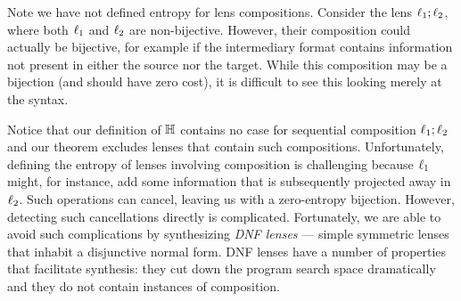 \documentclass[acmsmall,screen,anonymous]{acmart}
\begin{document}
Note we have not defined entropy for lens compositions. Consider the lens
$\mathit{\ell}_1 ; \mathit{\ell}_2$, where both $\mathit{\ell}_1$ and $\mathit{\ell}_2$ are non-bijective.
However, their composition could actually be bijective, for example if the
intermediary format contains information not present in either the source nor
the target. While this composition may be a bijection (and should have zero
cost), it is difficult to see this looking merely at the syntax.

Notice that our definition of $\mathbb{H}$ contains no case for sequential
composition $\mathit{\ell}_1 ; \mathit{\ell}_2$ and our theorem excludes lenses that contain
such compositions. Unfortunately, defining the entropy of lenses involving
composition is challenging because $\mathit{\ell}_1$ might, for instance, add some
information that is subsequently projected away in $\mathit{\ell}_2$. Such operations
can cancel, leaving us with a zero-entropy bijection. However, detecting such
cancellations directly is complicated. Fortunately, we are able to avoid such
complications by synthesizing \emph{DNF lenses} — simple symmetric lenses that
inhabit a disjunctive normal form. DNF lenses have a number of properties that
facilitate synthesis: they cut down the program search space dramatically and
they do not contain instances of composition.


\end{document}
